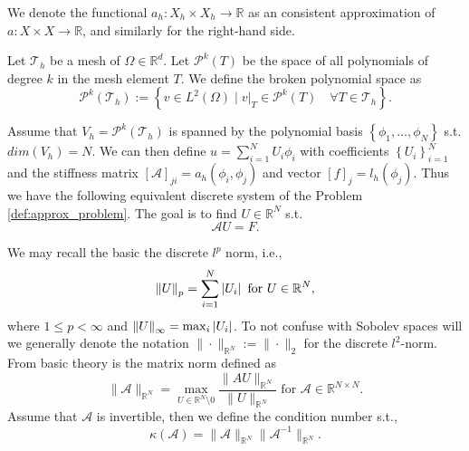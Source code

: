 We denote the functional $a_{h}: X_{h} \times X_{h} \to \mathbb{R} $ as an consistent approximation of $a: X \times X \to \mathbb{R} $, and similarly for the right-hand side.


\begin{definition}
    Let $\mathcal{T}_{h} $ be a mesh of $\Omega \in \mathbb{R} ^{d} $. Let $\mathcal{P}^{k}(T) $ be the space of all polynomials of degree $k$ in the mesh element $T$. We define the broken polynomial space as \[
    \mathcal{P}^{k} ( \mathcal{T}_{h} ) := \left\{ v \in L^2( \Omega )  \mid  v|_{T} \in \mathcal{P}^k( T) \quad  \forall T \in  \mathcal{T}_{h}   \right\}.
    \]
\end{definition}


Assume that $V_{h} = \mathcal{P} ^{k}( \mathcal{T} _{h}) $ is spanned by the polynomial basis $\left\{ \phi _{1}, \ldots, \phi _{N}  \right\} $ s.t. $dim(V_{h}) = N$. We can then define $u = \sum_{i=1}^{N}  U_{i} \phi_{i} $ with coefficients $\left\{
U_{i}\right\} _{i=1}^{N}$ and the stiffness matrix $\left[ \mathcal{A}  \right] _{ji} = a_{h}( \phi _{i}, \phi _{j}) $ and vector $\left[ f \right] _{j} = l_{h}( \phi_{j} ) $. Thus we have the following equivalent discrete system of the Problem
\ref{def:approx_problem}. The goal is to find $U \in \mathbb{R} ^{N}$ s.t.  \[
\mathcal{A} U =F.
\]

We may recall the basic the discrete $l^{p}$ norm, i.e.,\[
    \| U  \|_{ p }^{  } = \sum_{i=1}^{N}  \left\lvert  U_{i}   \right\rvert \text{ for } U \in \mathbb{R} ^{N}
,
\]
where $1\le p < \infty$ and $\| U \|_{ \infty }^{  }  = \max_{i}  \left\lvert  U_i  \right\rvert $.
To not confuse with Sobolev spaces will we generally denote the notation $\| \cdot  \|_{ \mathbb{R} ^{N} }^{  } := \| \cdot  \|_{ 2 }^{  }   $ for the discrete $l^2$-norm.
From basic theory is the matrix norm defined as \[
\| \mathcal{A}  \|_{ \mathbb{R} ^{N} }^{  }  = \max_{U \in \mathbb{R} ^{N} \setminus 0} \frac{\| AU \|_{ \mathbb{R} ^{N} }^{  } }{\| U \|_{\mathbb{R} ^{N}  }^{  } } \text{ for } \mathcal{A} \in \mathbb{R} ^{N\times N}.
\]
Assume that $\mathcal{A} $ is invertible, then we define the condition number s.t., \[
\kappa ( \mathcal{A} ) = \| \mathcal{A}  \|_{ \mathbb{R} ^{N} }^{  } \| \mathcal{A} ^{-1} \|_{ \mathbb{R} ^{N} }  .
\]







